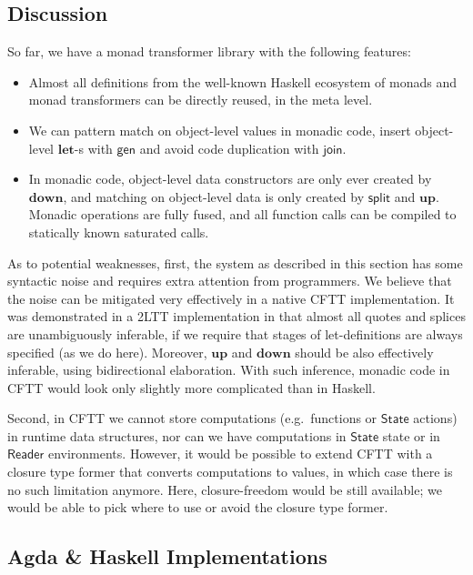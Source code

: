 \documentclass[acmsmall]{acmart}
\newcommand{\mit}[1]{{\mathsf{#1}}}
\newcommand{\msf}[1]{{\mathsf{#1}}}
\newcommand{\mbf}[1]{{\mathbf{#1}}}
\newcommand{\Reader}{\msf{Reader}}
\theoremstyle{remark}
\newcommand{\mup}{\mbf{up}}
\newcommand{\mdown}{\mbf{down}}
\newcommand{\gen}{\mit{gen}}
\newcommand{\State}{\msf{State}}
\newcommand{\join}{\mit{join}}
\begin{document}
\subsection{Discussion}

So far, we have a monad transformer library with the following features:
\begin{itemize}
\item Almost all definitions from the well-known Haskell ecosystem of monads and monad transformers
      can be directly reused, in the meta level.
\item We can pattern match on object-level values in monadic code, insert object-level $\mbf{let}$-s
      with $\gen$ and avoid code duplication with $\join$.
\item In monadic code, object-level data constructors are only ever created by
      $\mdown$, and matching on object-level data is only created by $\mit{split}$
      and $\mup$. Monadic operations are fully fused, and all function calls can be
      compiled to statically known saturated calls.
\end{itemize}

As to potential weaknesses, first, the system as described in this section has
some syntactic noise and requires extra attention from programmers.  We believe
that the noise can be mitigated very effectively in a native CFTT
implementation. It was demonstrated in a 2LTT implementation in
\cite{staged-demo} that almost all quotes and splices are unambiguously
inferable, if we require that stages of let-definitions are always specified (as
we do here). Moreover, $\mup$ and $\mdown$ should be also effectively inferable,
using bidirectional elaboration. With such inference, monadic code in CFTT would
look only slightly more complicated than in Haskell.

Second, in CFTT we cannot store computations (e.g.\ functions or $\State$
actions) in runtime data structures, nor can we have computations in $\State$
state or in $\Reader$ environments. However, it would be possible to extend CFTT
with a closure type former that converts computations to values, in which case
there is no such limitation anymore. Here, closure-freedom would be still
available; we would be able to pick where to use or avoid the closure type
former.

\subsection{Agda \& Haskell Implementations}
\end{document}
